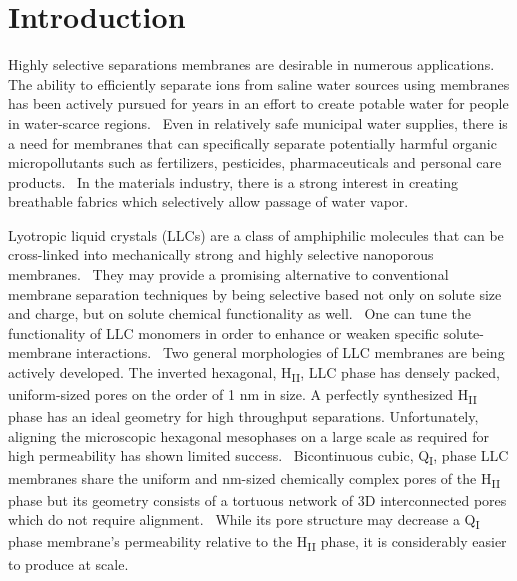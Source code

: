 \documentclass[aps,pre,preprint,groupedaddress,longbibliography]{revtex4-2}
\begin{document}
  \maketitle
  
  \graphicspath{{./figures/}}

  \section{Introduction}

  Highly selective separations membranes are desirable in numerous
  applications. The ability to efficiently separate ions from saline water
  sources using membranes has been actively pursued for years in an effort to
  create potable water for people in water-scarce
  regions.~\cite{werber_materials_2016} Even in relatively safe municipal water
  supplies, there is a need for membranes that can specifically separate
  potentially harmful organic micropollutants such as fertilizers, pesticides,
  pharmaceuticals and personal care products.~\cite{barbosa_occurrence_2016} In
  the materials industry, there is a strong interest in creating breathable
  fabrics which selectively allow passage of water
  vapor.~\cite{mondloch_destruction_2015}

  Lyotropic liquid crystals (LLCs) are a class of amphiphilic molecules that
  can be cross-linked into mechanically strong and highly selective nanoporous
  membranes.~\cite{gin_polymerized_2008} They may provide a promising
  alternative to conventional membrane separation techniques by being selective
  based not only on solute size and charge, but on solute chemical
  functionality as well.~\cite{dischinger_application_2017} One can tune the
  functionality of LLC monomers in order to enhance or weaken specific
  solute-membrane interactions.~\cite{dischinger_effect_2017} Two general
  morphologies of LLC membranes are being actively developed. The inverted
  hexagonal, H\textsubscript{II}, LLC phase has densely packed, uniform-sized
  pores on the order of 1 nm in size. A perfectly synthesized
  H\textsubscript{II} phase has an ideal geometry for high throughput
  separations. Unfortunately, aligning the microscopic hexagonal mesophases on
  a large scale as required for high permeability has shown limited
  success.~\cite{feng_scalable_2014,feng_thin_2016} Bicontinuous cubic,
  Q\textsubscript{I}, phase LLC membranes share the uniform and nm-sized chemically
  complex pores of the H\textsubscript{II} phase but its geometry consists of a
  tortuous network of 3D interconnected pores which do not require
  alignment.~\cite{carter_glycerol-based_2012} While its pore structure may
  decrease a Q\textsubscript{I} phase membrane's permeability relative to the
  H\textsubscript{II} phase, it is considerably easier to produce 
  at scale.~\cite{hatakeyama_nanoporous_2010}
  
\end{document}
